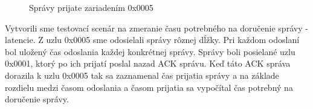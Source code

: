 \documentclass[slovak,master]{diploma}
\begin{document}
\newpage
\begin{figure}[h!]
  \centering
  \caption{Správy prijate zariadením 0x0005}
  \label{fig:packetLoss}
\end{figure}

Vytvorili sme testovací scenár na zmeranie času potrebného na doručenie správy - latencie. Z uzlu 0x0005 sme odosielali správy rôznej dĺžky. Pri každom odoslaní 
bol uložený čas odoslania každej konkrétnej správy. Správy boli posielané uzlu 0x0001, ktorý po ich prijatí poslal nazad ACK správu. Keď táto ACK správa dorazila 
k uzlu 0x0005 tak sa zaznamenal čas prijatia správy a na základe rozdielu medzi časom odoslania a časom prijatia sa vypočítal čas potrebný na doručenie správy.
\end{document}
